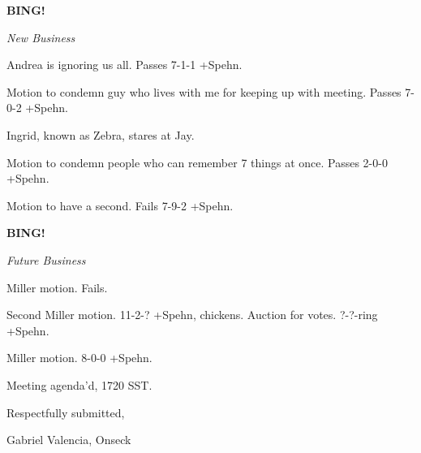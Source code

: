 \documentclass[12pt]{article}
\newcommand{\bing}{{\bf BING!} }
\newcommand{\goto}[1]{\bing \vskip 12pt \centerline{{\em{#1}}}}
\begin{document}
\goto{New Business}

Andrea is ignoring us all. Passes 7-1-1 +Spehn.

Motion to condemn guy who lives with me for keeping up with meeting. Passes 7-0-2 +Spehn.

Ingrid, known as Zebra, stares at Jay.

Motion to condemn people who can remember 7 things at once. Passes 2-0-0 +Spehn.

Motion to have a second. Fails 7-9-2 +Spehn.

\goto{Future Business}

Miller motion. Fails.

Second Miller motion. 11-2-? +Spehn, chickens. Auction for votes. ?-?-ring +Spehn.

Miller motion. 8-0-0 +Spehn.

\vspace{12pt}

\noindent
Meeting agenda'd, 1720 SST.

\vspace{18pt}

\centerline{Respectfully submitted,}
\centerline{Gabriel Valencia, Onseck}
\end{document}
